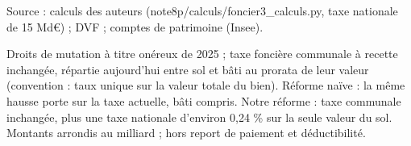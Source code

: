 Source : calculs des auteurs (note8p/calculs/foncier3\_calculs.py, taxe nationale de 15 Md€) ; DVF ; comptes de patrimoine (Insee).\par Droits de mutation à titre onéreux de 2025 ; taxe foncière communale à recette inchangée, répartie aujourd'hui entre sol et bâti au prorata de leur valeur (convention : taux unique sur la valeur totale du bien). Réforme naïve : la même hausse porte sur la taxe actuelle, bâti compris. Notre réforme : taxe communale inchangée, plus une taxe nationale d'environ 0,24 \% sur la seule valeur du sol. Montants arrondis au milliard ; hors report de paiement et déductibilité.
